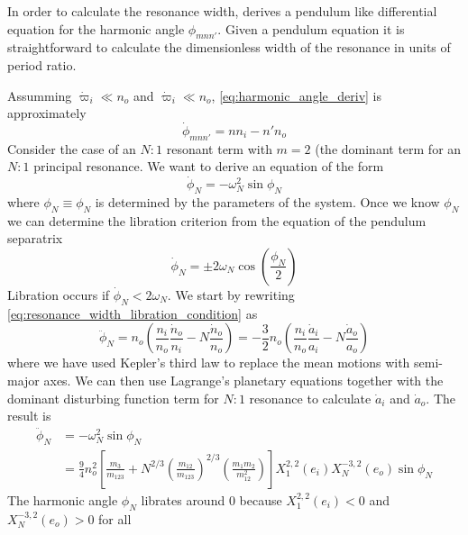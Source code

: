 \documentclass[twoside,openright,titlepage,numbers=noenddot,headinclude,%
                footinclude=true,cleardoublepage=empty,abstractoff, 
                BCOR=5mm,paper=a4,fontsize=11pt,%
                american,%
                ]{scrreprt}%
\begin{document}
In order to calculate the resonance width, \citet{Mardling2013} derives
a pendulum like differential equation for the harmonic angle $\phi_{mnn'}$.
Given a pendulum equation it is straightforward to calculate the dimensionless
width of the resonance in units of period ratio.

Assumming $\dot{\varpi}_i\ll n_o$ and $\dot{\varpi}_i\ll n_o$,
\cref{eq:harmonic_angle_deriv} is approximately
\begin{equation}
    \dot{\phi}_{mnn'}=nn_i-n'n_o
    \label{eq:resonance_width_libration_condition}
\end{equation}
Consider the case of an $N:1$ resonant term with $m=2$ (the dominant
term for an $N:1$ principal resonance. We want to derive an equation of
the form
\begin{equation}
    \dot{\phi}_{N}=-\omega_{N}^2\sin\phi_{N}
\end{equation}
where $\phi_{N}\equiv\phi_N$ is determined by the parameters of the system. Once 
we know $\phi_{N}$ we can determine the libration criterion from the
equation of the pendulum separatrix 
\begin{equation}
    \dot{\phi}_{N}=\pm 2\omega_{N}\cos\left( \frac{\phi_{N}}{2} \right)
\end{equation}
Libration occurs if $\dot{\phi}_{N}<2\omega_{N}$. 
We start by rewriting \cref{eq:resonance_width_libration_condition} as
\begin{equation}
    \ddot{\phi}_{N}=n_o\left( \frac{n_i}{n_o} \frac{\dot{n}_o}{n_i} 
    -N \frac{\dot{n}_o}{n_o} \right)=- \frac{3}{2} n_o\left(
    \frac{n_i}{n_o} \frac{\dot{a}_i}{a_i} -N \frac{\dot{a}_o}{a_o} 
    \right)
\end{equation}
where we have used Kepler's third law to replace the mean motions with
semi-major axes. We can then use Lagrange's planetary equations 
together with the dominant disturbing function term for $N:1$ resonance
to calculate $\dot{a}_i$ and $\dot{a}_o$. The result is
\begin{equation}
\begin{aligned}
    \ddot{\phi}_{N}&=-\omega_{N}^2\sin\phi_{N}\\&= \frac{9}{4} 
    n_o^2\left[ \frac{m_3}{m_{123}} +
    N^{2/3}\left( \frac{m_{12}}{m_{123}}
    \right)^{2/3}\left( \frac{m_1m_2}{m_{12}^2} \right)\right]
    X^{2,2}_1(e_i)X^{-3,2}_N(e_o)\sin\phi_{N}
\end{aligned}
\end{equation}
The harmonic angle $\phi_N$ librates around $0$ because 
$X^{2,2}_1(e_i)<0$ and $X^{-3,2}_N(e_o)>0$ for all
\end{document}

